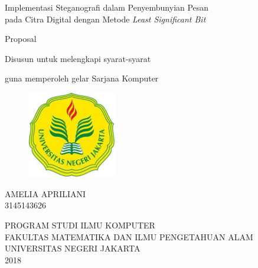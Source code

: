 \thispagestyle{empty}
\begin{center}
\large {Implementasi Steganografi dalam Penyembunyian Pesan \\ pada Citra Digital dengan Metode \emph{Least Significant Bit}}
\end{center}
\bigskip
\vspace{2mm}


\begin{center}
\large{Proposal}

\large{Disusun untuk melengkapi syarat-syarat}

\large{guna memperoleh gelar Sarjana Komputer}

\end{center}


\vspace{5mm}

\begin{figure}[htbp]
\begin{center}
 \includegraphics[width=0.35\textwidth,]{gambar/unj.jpg}
       \end{center}
\end{figure}

\begin{center}
\large{AMELIA APRILIANI}\\
 \large{3145143626}
\end{center}

\vspace{20mm}

\begin{center}
{PROGRAM STUDI ILMU KOMPUTER\\
FAKULTAS MATEMATIKA DAN ILMU PENGETAHUAN ALAM \\
UNIVERSITAS NEGERI JAKARTA \\ 2018}
\end{center}
